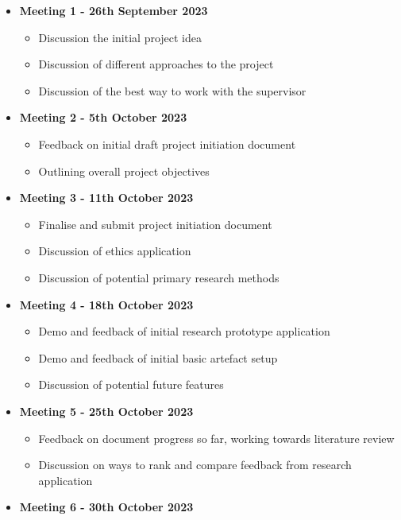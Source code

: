 \begin{itemize}
    \item \textbf{Meeting 1 - 26th September 2023}
    \begin{itemize}
        \item Discussion the initial project idea
        \item Discussion of different approaches to the project
        \item Discussion of the best way to work with the supervisor
    \end{itemize}
    \item \textbf{Meeting 2 - 5th October 2023}
    \begin{itemize}
        \item Feedback on initial draft project initiation document
        \item Outlining overall project objectives
    \end{itemize}
    \item \textbf{Meeting 3 - 11th October 2023}
    \begin{itemize}
        \item Finalise and submit project initiation document
        \item Discussion of ethics application
        \item Discussion of potential primary research methods
    \end{itemize}
    \item \textbf{Meeting 4 - 18th October 2023}
    \begin{itemize}
        \item Demo and feedback of initial research prototype application
        \item Demo and feedback of initial basic artefact setup
        \item Discussion of potential future features
    \end{itemize}
    \item \textbf{Meeting 5 - 25th October 2023}
    \begin{itemize}
        \item Feedback on document progress so far, working towards literature review
        \item Discussion on ways to rank and compare feedback from research application
    \end{itemize}
    \item \textbf{Meeting 6 - 30th October 2023}
    \begin{itemize}

\end{itemize}
\end{itemize}
